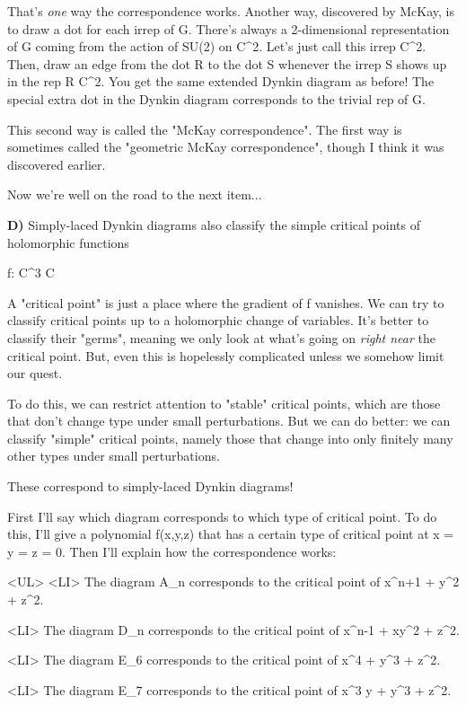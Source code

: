 That's \emph{one} way the correspondence works.  Another way, discovered
by McKay, is to draw a dot for each irrep of G.  There's always a
2-dimensional representation of G coming from the action of SU(2) 
on C^{2}.  Let's just call this irrep C^{2}.  
Then, draw an edge
from the dot R to the dot S whenever the irrep S shows up 
in the rep R \otimes  C^{2}.
You get the same extended Dynkin diagram as before!
The special extra dot in the Dynkin diagram corresponds to the 
trivial rep of G.

This second way is called the "McKay correspondence".  The first way
is sometimes called the "geometric McKay correspondence", though I think
it was discovered earlier.

Now we're well on the road to the next item...

\textbf{D)} 
Simply-laced Dynkin diagrams also classify the simple critical points
of holomorphic functions 

f: C^{3} \to  C

A "critical point" is just a place where the gradient of f vanishes.
We can try to classify critical points up to a holomorphic change of 
variables.  It's better to classify their "germs", meaning we only 
look at what's going on \emph{right near} the critical point.   But, even 
this is hopelessly complicated unless we somehow limit our quest.

To do this, we can restrict attention to "stable" critical points, 
which are those that don't change type under small perturbations.  
But we can do better: we can classify "simple" critical points, 
namely those that change into only finitely many other types under 
small perturbations.

These correspond to simply-laced Dynkin diagrams!

First I'll say which diagram corresponds to which type of critical
point.  To do this, I'll give a polynomial f(x,y,z) that has a certain 
type of critical point at x = y = z = 0.  Then I'll explain how
the correspondence works:

<UL>
<LI>
The diagram A_{n} corresponds to the critical point of x^{n+1} + y^{2} + z^{2}.

<LI>
The diagram D_{n} corresponds to the critical point of x^{n-1} + xy^{2} + z^{2}.

<LI>
The diagram E_{6} corresponds to the critical point of x^{4} + y^{3} + z^{2}.

<LI>
The diagram E_{7} corresponds to the critical point of x^{3} y + y^{3} + z^{2}.

